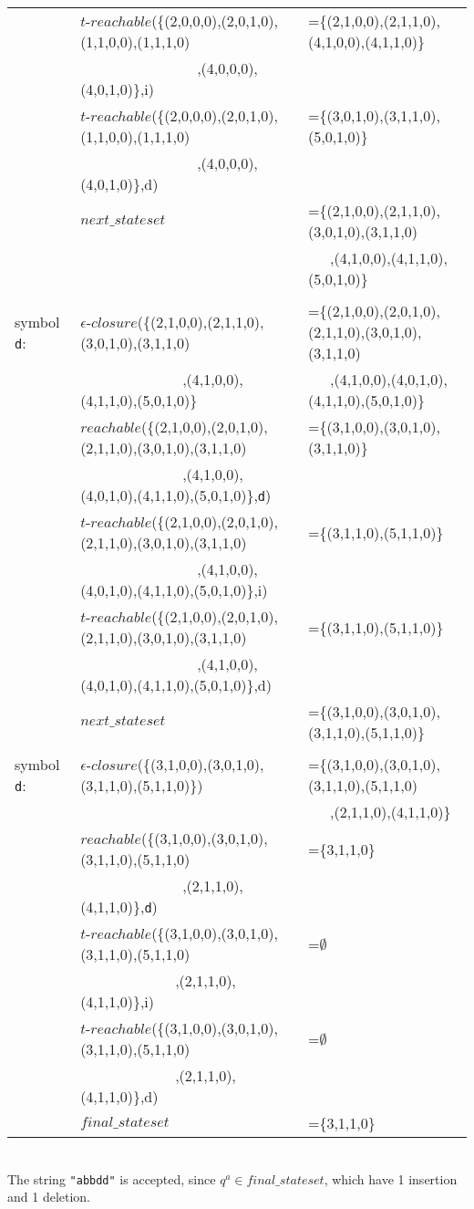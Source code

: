 \begin{myex}
\begin{table}[h!]
\begin{tabular}{l l l}
&$t$-$reachable$(\{(2,0,0,0),(2,0,1,0),(1,1,0,0),(1,1,1,0)&=\{(2,1,0,0),(2,1,1,0),(4,1,0,0),(4,1,1,0)\}\\
&~~~~~~~~~~~~~~~~,(4,0,0,0),(4,0,1,0)\},i)\\

&$t$-$reachable$(\{(2,0,0,0),(2,0,1,0),(1,1,0,0),(1,1,1,0)&=\{(3,0,1,0),(3,1,1,0),(5,0,1,0)\}\\
&~~~~~~~~~~~~~~~~,(4,0,0,0),(4,0,1,0)\},d)\\

&$next\_stateset$&=\{(2,1,0,0),(2,1,1,0),(3,0,1,0),(3,1,1,0)\\
&&~~~,(4,1,0,0),(4,1,1,0),(5,0,1,0)\}\\
\\
symbol {\tt d}:&$\epsilon$-$closure$(\{(2,1,0,0),(2,1,1,0),(3,0,1,0),(3,1,1,0)&=\{(2,1,0,0),(2,0,1,0),(2,1,1,0),(3,0,1,0),(3,1,1,0)\\
&~~~~~~~~~~~~~~,(4,1,0,0),(4,1,1,0),(5,0,1,0)\}&~~~,(4,1,0,0),(4,0,1,0),(4,1,1,0),(5,0,1,0)\}\\
&$reachable$(\{(2,1,0,0),(2,0,1,0),(2,1,1,0),(3,0,1,0),(3,1,1,0)&=\{(3,1,0,0),(3,0,1,0),(3,1,1,0)\}\\
&~~~~~~~~~~~~~~,(4,1,0,0),(4,0,1,0),(4,1,1,0),(5,0,1,0)\},{\tt d})\\

&$t$-$reachable$(\{(2,1,0,0),(2,0,1,0),(2,1,1,0),(3,0,1,0),(3,1,1,0)&=\{(3,1,1,0),(5,1,1,0)\}\\
&~~~~~~~~~~~~~~~~,(4,1,0,0),(4,0,1,0),(4,1,1,0),(5,0,1,0)\},i)\\

&$t$-$reachable$(\{(2,1,0,0),(2,0,1,0),(2,1,1,0),(3,0,1,0),(3,1,1,0)&=\{(3,1,1,0),(5,1,1,0)\}\\
&~~~~~~~~~~~~~~~~,(4,1,0,0),(4,0,1,0),(4,1,1,0),(5,0,1,0)\},d)\\
&$next\_stateset$&=\{(3,1,0,0),(3,0,1,0),(3,1,1,0),(5,1,1,0)\}\\
\\
symbol {\tt d}:&$\epsilon$-$closure$(\{(3,1,0,0),(3,0,1,0),(3,1,1,0),(5,1,1,0)\})&=\{(3,1,0,0),(3,0,1,0),(3,1,1,0),(5,1,1,0)\\
&&~~~,(2,1,1,0),(4,1,1,0)\}\\
&$reachable$(\{(3,1,0,0),(3,0,1,0),(3,1,1,0),(5,1,1,0)&=\{3,1,1,0\}\\
&~~~~~~~~~~~~~~,(2,1,1,0),(4,1,1,0)\},{\tt d})\\
&$t$-$reachable$(\{(3,1,0,0),(3,0,1,0),(3,1,1,0),(5,1,1,0)&=$\emptyset$\\
&~~~~~~~~~~~~~,(2,1,1,0),(4,1,1,0)\},i)\\
&$t$-$reachable$(\{(3,1,0,0),(3,0,1,0),(3,1,1,0),(5,1,1,0)&=$\emptyset$\\
&~~~~~~~~~~~~~,(2,1,1,0),(4,1,1,0)\},d)\\
&$final\_stateset$&=\{3,1,1,0\}
\end{tabular}
\end{table}\\
The string {\tt "abbdd"} is accepted, since $q^a\in final\_stateset$, which have 1 insertion and 1 deletion.
\end{myex}
